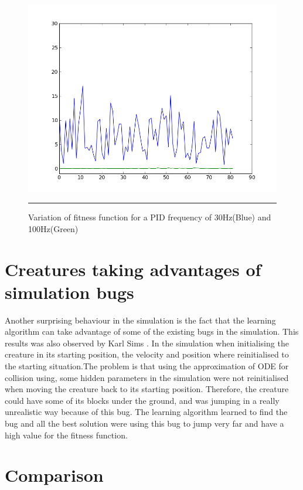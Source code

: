 \begin{figure}[htbp]
    \centering
    \includegraphics[scale=0.8]{Figures/figure_simulation_consitency.png}
    \rule{35em}{0.5pt}
    \caption[Simulation Consistency]{Variation of fitness function for a PID frequency of 30Hz(Blue) and 100Hz(Green)}
    \label{fig:figure_simulation_consistency}
\end{figure}


    
\section{ Creatures taking advantages of simulation bugs}
Another surprising behaviour in the simulation is the fact that the learning algorithm can take advantage of some of the existing bugs in the simulation. This results was also observed by Karl Sims \cite{karl}. In the simulation when initialising the creature in its starting position, the velocity and position where reinitialised to the starting situation.The problem is that using the approximation of ODE for collision using, some hidden parameters in the simulation were not reinitialised when moving the creature back to its starting position. Therefore, the creature could have some of its blocks under the ground, and was jumping in a really unrealistic way because of this bug. The learning algorithm learned to find the bug and all the best solution were using this bug to jump very far and have a high value for the fitness function.
    
\section { Comparison }

